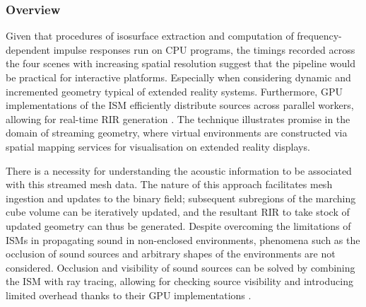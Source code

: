 \subsubsection{Overview}
Given that procedures of isosurface extraction and computation of frequency-dependent impulse responses run on CPU programs, the timings recorded across the four scenes with increasing spatial resolution suggest that the pipeline would be practical for interactive platforms. Especially when considering dynamic and incremented geometry typical of extended reality systems. Furthermore, GPU implementations of the ISM efficiently distribute sources across parallel workers, allowing for real-time RIR generation \citep{diaz2021gpurir}. The technique illustrates promise in the domain of streaming geometry, where virtual environments are constructed via spatial mapping services for visualisation on extended reality displays. \par
There is a necessity for understanding the acoustic information to be associated with this streamed mesh data. The nature of this approach facilitates mesh ingestion and updates to the binary field; subsequent subregions of the marching cube volume can be iteratively updated, and the resultant RIR to take stock of updated geometry can thus be generated. Despite overcoming the limitations of ISMs in propagating sound in non-enclosed environments, phenomena such as the occlusion of sound sources and arbitrary shapes of the environments are not considered. Occlusion and visibility of sound sources can be solved by combining the ISM with ray tracing, allowing for checking source visibility and introducing limited overhead thanks to their GPU implementations \citep{taylor2012guided}.\par

